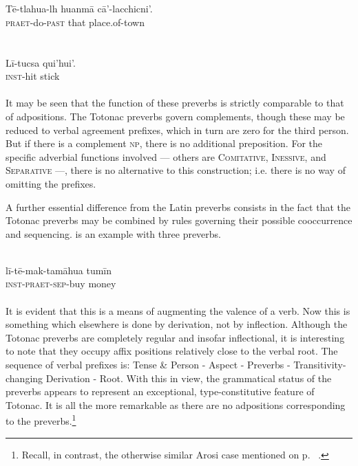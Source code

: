 \ea\label{ex:E81}
\langinfo{\LangToton}{}{}\\
 \ea {}\\
 \gll T\=e-tlahua-lh  huanm\=a  c\=a'-lacchicni'.\\
   \textsc{praet}-do-\textsc{past}  that  place.of-town\\
\\
\ex {}\\
\gll  L\=i-tucsa  qui'hui'.\\
 \textsc{inst}-hit  stick\\
\\
\z
\z
\noindent 
It may be seen that the function of these preverbs is strictly comparable to that of adpositions. The Totonac preverbs govern complements, though these may be reduced to verbal agreement prefixes, which in turn are zero for the third person. But if there is a complement \textsc{np}, there is no additional preposition. For the specific adverbial functions involved — others are \textsc{Comitative}, \textsc{Inessive}, and \textsc{Separative} —, there is no alternative to this construction; i.e. there is no way of omitting the prefixes.

A further essential difference from the Latin preverbs consists in the fact that the Totonac preverbs may be combined by rules governing their possible cooccurrence and sequencing.  is an example with three preverbs.

\ea\label{ex:E82}
 \\
\gll l\=i-t\=e-mak-tam\=ahua  tum\=in\\
\textsc{inst}-\textsc{praet}-\textsc{sep}-buy  money\\
\\
\z
\noindent It is evident that this is a means of augmenting the valence of a verb. Now this is something which elsewhere is done by derivation, not by inflection. Although the Totonac preverbs are completely regular and insofar inflectional, it is interesting to note that they occupy affix positions relatively close to the verbal root. The sequence of verbal prefixes is: Tense \& Person - Aspect - Preverbs - Transitivity-changing Derivation - Root. With this in view, the grammatical status of the preverbs appears to represent an exceptional, type-constitutive feature of Totonac. It is all the more remarkable as there are no adpositions corresponding to the preverbs.\footnote{Recall, in contrast, the otherwise similar Arosi case mentioned on p.~\pageref{page105}\chkfn%
.}

